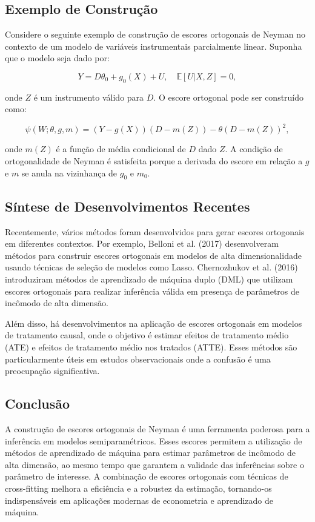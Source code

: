 \documentclass[a4paper,12pt]{article}[abntex2]
\begin{document}
\subsection*{Exemplo de Construção}

Considere o seguinte exemplo de construção de escores ortogonais de Neyman no contexto de um modelo de variáveis instrumentais parcialmente linear. Suponha que o modelo seja dado por:

\[
Y = D\theta_0 + g_0(X) + U, \quad \mathbb{E}[U | X,Z] = 0,
\]

onde $Z$ é um instrumento válido para $D$. O escore ortogonal pode ser construído como:

\[
\psi(W; \theta, g, m) = (Y - g(X))(D - m(Z)) - \theta (D - m(Z))^2,
\]

onde $m(Z)$ é a função de média condicional de $D$ dado $Z$. A condição de ortogonalidade de Neyman é satisfeita porque a derivada do escore em relação a $g$ e $m$ se anula na vizinhança de $g_0$ e $m_0$.

\subsection*{Síntese de Desenvolvimentos Recentes}

Recentemente, vários métodos foram desenvolvidos para gerar escores ortogonais em diferentes contextos. Por exemplo, Belloni et al. (2017) desenvolveram métodos para construir escores ortogonais em modelos de alta dimensionalidade usando técnicas de seleção de modelos como Lasso. Chernozhukov et al. (2016) introduziram métodos de aprendizado de máquina duplo (DML) que utilizam escores ortogonais para realizar inferência válida em presença de parâmetros de incômodo de alta dimensão.

Além disso, há desenvolvimentos na aplicação de escores ortogonais em modelos de tratamento causal, onde o objetivo é estimar efeitos de tratamento médio (ATE) e efeitos de tratamento médio nos tratados (ATTE). Esses métodos são particularmente úteis em estudos observacionais onde a confusão é uma preocupação significativa.

\subsection*{Conclusão}

A construção de escores ortogonais de Neyman é uma ferramenta poderosa para a inferência em modelos semiparamétricos. Esses escores permitem a utilização de métodos de aprendizado de máquina para estimar parâmetros de incômodo de alta dimensão, ao mesmo tempo que garantem a validade das inferências sobre o parâmetro de interesse. A combinação de escores ortogonais com técnicas de cross-fitting melhora a eficiência e a robustez da estimação, tornando-os indispensáveis em aplicações modernas de econometria e aprendizado de máquina.
\end{document}
